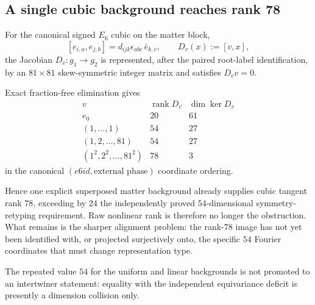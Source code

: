 \subsection*{A single cubic background reaches rank 78}

For the canonical signed $E_6$ cubic on the matter block,
\[
 [e_{i,a},e_{j,b}]=d_{ijk}\epsilon_{abc}\,\bar e_{k,c},
\qquad
D_v(x):=[v,x],
\]
the Jacobian $D_v:g_1\to g_2$ is represented, after the paired root-label
identification, by an $81\times81$ skew-symmetric integer matrix and satisfies
$D_vv=0$.

Exact fraction-free elimination gives
\[
\begin{array}{c|c|c}
v & \operatorname{rank}D_v & \dim\ker D_v\\ \hline
e_0 & 20 & 61\\
(1,\ldots,1) & 54 & 27\\
(1,2,\ldots,81) & 54 & 27\\
(1^2,2^2,\ldots,81^2) & 78 & 3
\end{array}
\]
in the canonical $(e6id,\text{external phase})$ coordinate ordering.

Hence one explicit superposed matter background already supplies cubic tangent
rank $78$, exceeding by $24$ the independently proved $54$-dimensional
symmetry-retyping requirement.  Raw nonlinear rank is therefore no longer the
obstruction.  What remains is the sharper alignment problem: the rank-$78$
image has not yet been identified with, or projected surjectively onto, the
specific $54$ Fourier coordinates that must change representation type.

The repeated value $54$ for the uniform and linear backgrounds is not promoted
to an intertwiner statement: equality with the independent equivariance deficit
is presently a dimension collision only.
